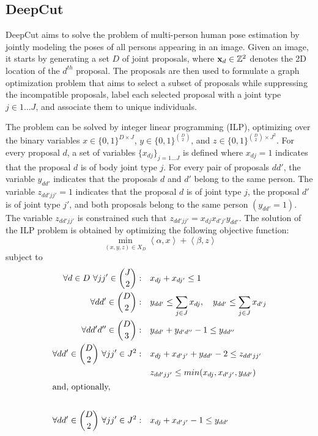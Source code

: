 \documentclass[runningheads]{llncs}
\begin{document}
\subsection{DeepCut}
\label{sec:deepcut}
DeepCut aims to solve the problem of multi-person human pose estimation by jointly modeling the poses of all persons appearing in an image. Given an image, it starts by generating a set $D$ of joint proposals, where $\bold{x}_d \in \mathbb{Z}^2$ denotes the 2D location of the $d^{th}$ proposal. The proposals are then used to formulate a graph optimization problem that aims to select a subset of proposals while suppressing the incompatible proposals, label each selected proposal with a joint type $j \in {1 \dots J}$, and associate them to unique individuals. 

The problem can be solved by integer linear programming (ILP), optimizing over the binary variables $x \in \{0,1\}^{D \times J}$, $y \in \{0,1\}^{\binom D2}$, and $z \in \{0,1\}^{\binom D2 \times J^2}$. For every proposal $d$, a set of variables $\{x_{dj}\}_{j = 1 \dots J}$ is defined where $x_{dj} = 1$ indicates that the proposal $d$ is of body joint type $j$. For every pair of proposals $dd'$, the variable $y_{dd'}$ indicates that the proposals $d$ and $d'$ belong to the same person. The variable $z_{dd'jj'} = 1$ indicates that the proposal $d$ is of  joint type $j$, the proposal $d'$ is of joint type $j'$, and both proposals belong to the same person $(y_{dd'} = 1)$. The variable $z_{dd'jj'}$ is constrained such that $z_{dd'jj'} = x_{dj}x_{d'j'}y_{dd'}$. The solution of the ILP problem is obtained by optimizing the following objective function: 
\begin{equation}
\min_{(x,y,z) \in X_{D}} \left\langle \alpha, x \right\rangle + \left\langle \beta, z \right\rangle \label{eq:ilp_obj}
\end{equation}
subject to 
\begin{align}
\forall d \in D~\forall jj' \in \binom J2 :& \quad x_{dj} + x_{dj'} \leq 1 \label{eq:con1}\\
\forall dd' \in \binom D2 :& \quad y_{dd'} \leq \sum_{j \in J} x_{dj}, \quad y_{dd'} \leq \sum_{j \in J} x_{d'j} \label{eq:con2} \\
\forall dd'd'' \in \binom D3 :& \quad y_{dd'} + y_{d'd''} - 1 \leq y_{dd''} \label{eq:con3}\\
\forall dd' \in \binom D2~\forall jj' \in J^2 :& \quad x_{dj} + x_{d'j'} + y_{dd'} - 2 \leq z_{dd'jj'} \nonumber \\
& \quad z_{dd'jj'} \leq min(x_{dj}, x_{d'j'}, y_{dd'}) \label{eq:con4} \\
\shortintertext{and, optionally, } \nonumber \\
\forall dd' \in \binom D2~\forall jj' \in J^2 :& \quad x_{dj} + x_{d'j'} -1 \leq y_{dd'} \label{eq:con5}
\end{align}
\end{document}
